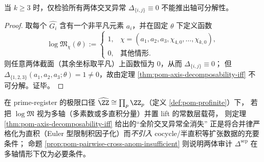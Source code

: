 \begin{proposition}\label{prop:pom-pairwise-cross-anom-insufficient}
当 \(k\ge 3\) 时，仅检验所有两体交叉异常 \(\Delta_{\{i,j\}}\equiv 0\) 不能推出轴可分解性。
\end{proposition}
\begin{proof}
取每个 \(\widehat{G_i}\) 含有一个非平凡元素 \(a_i\)，并在固定 \(\theta\) 下定义函数
\[
\log\mathfrak{M}_{\chi}(\theta):=
\begin{cases}
1, & \chi=(a_1,a_2,a_3,\chi_{4,0},\dots,\chi_{k,0}),\\
0, & \text{其他情形}.
\end{cases}
\]
则任意两体截面（其余坐标取平凡）上函数恒为 \(0\)，从而 \(\Delta_{\{i,j\}}\equiv 0\)；
但 \(\Delta_{\{1,2,3\}}(a_1,a_2,a_3;\theta)=1\neq 0\)，故由定理 \ref{thm:pom-axis-decomposability-iff} 不可分解。证毕。
\end{proof}

\begin{remark}\label{rem:pom-higher-cross-anom-euler}
在 prime-register 的极限口径 \(\widehat{\ZZ}\cong\prod_p\ZZ_p\)（定义 \ref{def:pom-profinite}）下，
若把 \(\log\mathfrak{M}\) 视为多轴（多素数或多直积分量）并置 lift 的常数层载荷，
则定理 \ref{thm:pom-axis-decomposability-iff} 给出的“全阶交叉异常全消失”
正是将合并律严格化为直积（Euler 型限制积因子化）而\emph{不引入} cocycle/半直积等扩张数据的充要条件；
命题 \ref{prop:pom-pairwise-cross-anom-insufficient} 则说明两体审计 \(\Delta^{\mathrm{sep}}\) 在多轴情形下仅为必要条件。
\end{remark}

